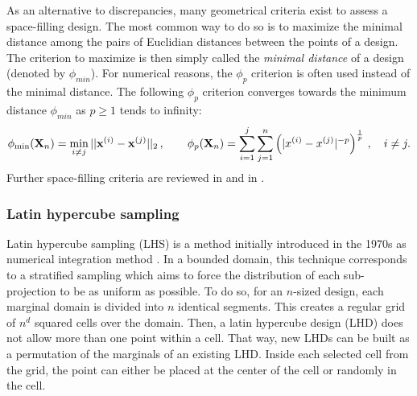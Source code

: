 As an alternative to discrepancies, many geometrical criteria exist to assess a space-filling design. 
The most common way to do so is to maximize the minimal distance among the pairs of Euclidian distances between the points of a design.  
The criterion to maximize is then simply called the \textit{minimal distance} of a design (denoted by $\phi_{min}$). 
For numerical reasons, the $\phi_p$ criterion is often used instead of the minimal distance. 
The following $\phi_p$ criterion converges towards the minimum distance $\phi_{min}$ as $p\geq1$ tends to infinity:
\begin{equation} 
    \phi_{\min}({\bf X}_n) = \min_{i \neq j} ||{\bf x}^{(i)} - {\bf x}^{(j)}||_2\, , \qquad
    \phi_p({\bf X}_n) = \sum_{i=1}^{j} \sum_{j=1}^{n} \left( |x^{(i)} - x^{(j)}|^{-p} \right)^{\frac{1}{p}}\, , \quad i \ne j.
\end{equation}
Further space-filling criteria are reviewed in \citet{abtini_2018} and in \citet[Appendix A]{daveiga_iooss_2021}. 


\subsubsection{Latin hypercube sampling}
Latin hypercube sampling (LHS) is a method initially introduced in the 1970s as numerical integration method \citep{mckay_beckman_1979}. 
In a bounded domain, this technique corresponds to a stratified sampling which aims to force the distribution of each sub-projection to be as uniform as possible. 
To do so, for an $n$-sized design, each marginal domain is divided into $n$ identical segments. 
This creates a regular grid of $n^{d}$ squared cells over the domain. 
Then, a latin hypercube design (LHD) does not allow more than one point within a cell. 
That way, new LHDs can be built as a permutation of the marginals of an existing LHD. 
Inside each selected cell from the grid, the point can either be placed at the center of the cell or randomly in the cell.

